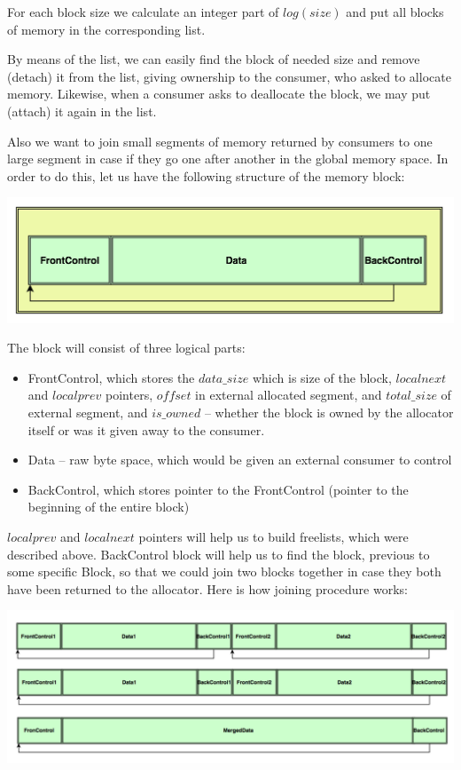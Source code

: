 \documentclass{article}
\begin{document}
For each block size we calculate an integer part of $log(size)$ and put all blocks of memory in the corresponding list.

By means of the list, we can easily find the block of needed size and remove (detach) it from the list, giving ownership to the consumer, who asked to allocate memory. Likewise, when a consumer asks to deallocate the block, we may put (attach) it again in the list.

Also we want to join small segments of memory returned by consumers to one large segment in case if they go one after another in the global memory space. In order to do this, let us have the following structure of the memory block:

\begin{center}\includegraphics[width=0.5 \textwidth]{image2.png}\end{center}

The block will consist of three logical parts:
\begin{itemize}
\item FrontControl, which stores the $data\_size$ which is size of the block, $localnext$ and $localprev$ pointers, $offset$ in external allocated segment, and $total\_size$ of external segment, and $is\_owned$ -- whether the block is owned by the allocator itself or was it given away to the consumer.
\item Data -- raw byte space, which would be given an external consumer to control
\item BackControl, which stores pointer to the FrontControl (pointer to the beginning of the entire block)
\end{itemize}

$localprev$ and $localnext$ pointers will help us to build freelists, which were described above. BackControl block will help us to find the block, previous to some specific Block, so that we could join two blocks together in case they both have been returned to the allocator. Here is how joining procedure works:

\begin{center}\includegraphics[width=1 \textwidth]{image3.png}\end{center}
\end{document}
